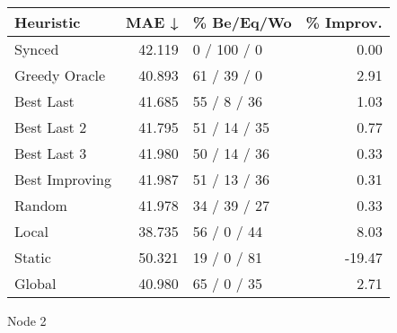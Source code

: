 \begin{tabular}{lrlr}
\toprule
\textbf{Heuristic} & \textbf{MAE ↓} & \textbf{\% Be/Eq/Wo} & \textbf{\% Improv.} \\
\midrule
            Synced &         42.119 &          0 / 100 / 0 &                0.00 \\
     Greedy Oracle &         40.893 &          61 / 39 / 0 &                2.91 \\
         Best Last &         41.685 &          55 / 8 / 36 &                1.03 \\
       Best Last 2 &         41.795 &         51 / 14 / 35 &                0.77 \\
       Best Last 3 &         41.980 &         50 / 14 / 36 &                0.33 \\
    Best Improving &         41.987 &         51 / 13 / 36 &                0.31 \\
            Random &         41.978 &         34 / 39 / 27 &                0.33 \\
             Local &         38.735 &          56 / 0 / 44 &                8.03 \\
            Static &         50.321 &          19 / 0 / 81 &              -19.47 \\
            Global &         40.980 &          65 / 0 / 35 &                2.71 \\
\bottomrule
\end{tabular}
\caption{Node 2}
\label{tab:iid_lr05_le2_bs4_2}
